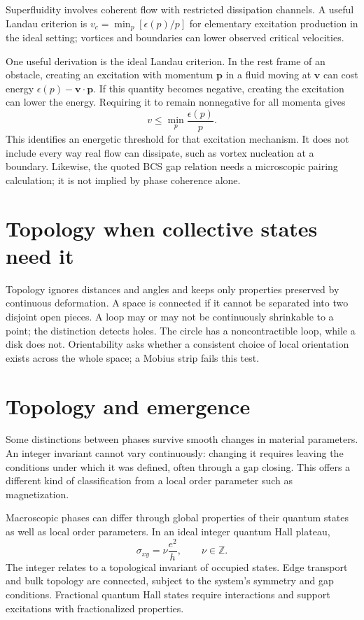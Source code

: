 \documentclass[11pt,oneside]{book}
\newcommand{\vect}[1]{\boldsymbol{#1}}
\theoremstyle{reviewstyle}
\begin{document}
Superfluidity involves coherent flow with restricted dissipation channels. A useful Landau criterion is $v_c=\min_p[\epsilon(p)/p]$ for elementary excitation production in the ideal setting; vortices and boundaries can lower observed critical velocities.

One useful derivation is the ideal Landau criterion. In the rest frame of an obstacle, creating an excitation with momentum $\vect p$ in a fluid moving at $\vect v$ can cost energy $\epsilon(p)-\vect v\cdot\vect p$. If this quantity becomes negative, creating the excitation can lower the energy. Requiring it to remain nonnegative for all momenta gives
\begin{equation}
v\leq\min_p\frac{\epsilon(p)}p.
\end{equation}
This identifies an energetic threshold for that excitation mechanism. It does not include every way real flow can dissipate, such as vortex nucleation at a boundary. Likewise, the quoted BCS gap relation needs a microscopic pairing calculation; it is not implied by phase coherence alone.

\section{Topology when collective states need it}
Topology ignores distances and angles and keeps only properties preserved by continuous deformation. A space is connected if it cannot be separated into two disjoint open pieces. A loop may or may not be continuously shrinkable to a point; the distinction detects holes. The circle has a noncontractible loop, while a disk does not. Orientability asks whether a consistent choice of local orientation exists across the whole space; a Mobius strip fails this test.

\section{Topology and emergence}
Some distinctions between phases survive smooth changes in material parameters. An integer invariant cannot vary continuously: changing it requires leaving the conditions under which it was defined, often through a gap closing. This offers a different kind of classification from a local order parameter such as magnetization.

Macroscopic phases can differ through global properties of their quantum states as well as local order parameters. In an ideal integer quantum Hall plateau,
\begin{equation}\sigma_{xy}=\nu\frac{e^2}{h},\qquad \nu\in\mathbb Z.\end{equation}
The integer relates to a topological invariant of occupied states. Edge transport and bulk topology are connected, subject to the system's symmetry and gap conditions. Fractional quantum Hall states require interactions and support excitations with fractionalized properties.
\end{document}
